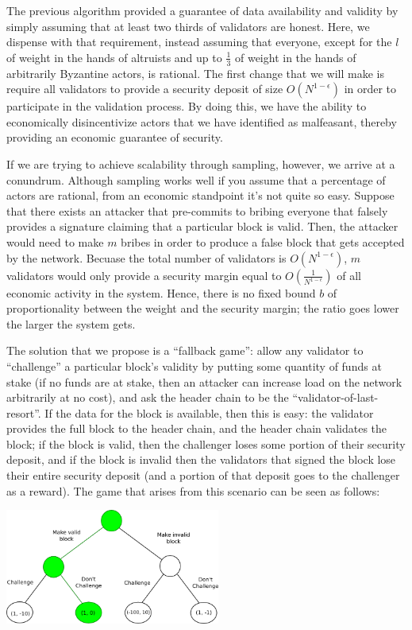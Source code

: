 \documentclass[11pt,a4paper]{report}
\theoremstyle{plain}
\theoremstyle{definition}
\theoremstyle{remark}
\begin{document}
The previous algorithm provided a guarantee of data availability and validity by simply assuming that at least two thirds of validators are honest. Here, we dispense with that requirement, instead assuming that everyone, except for the $l$ of weight in the hands of altruists and up to $\frac{1}{3}$ of weight in the hands of arbitrarily Byzantine actors, is rational. The first change that we will make is require all validators to provide a security deposit of size $O(N^{1-\epsilon})$ in order to participate in the validation process. By doing this, we have the ability to economically disincentivize actors that we have identified as malfeasant, thereby providing an economic guarantee of security.

If we are trying to achieve scalability through sampling, however, we arrive at a conundrum. Although sampling works well if you assume that a percentage of actors are rational, from an economic standpoint it's not quite so easy. Suppose that there exists an attacker that pre-commits to bribing everyone that falsely provides a signature claiming that a particular block is valid. Then, the attacker would need to make $m$ bribes in order to produce a false block that gets accepted by the network. Becuase the total number of validators is $O(N^{1-\epsilon})$, $m$ validators would only provide a security margin equal to $O(\frac{1}{N^{1-\epsilon}})$ of all economic activity in the system. Hence, there is no fixed bound $b$ of proportionality between the weight and the security margin; the ratio goes lower the larger the system gets.

The solution that we propose is a ``fallback game'': allow any validator to ``challenge'' a particular block's validity by putting some quantity of funds at stake (if no funds are at stake, then an attacker can increase load on the network arbitrarily at no cost), and ask the header chain to be the ``validator-of-last-resort''. If the data for the block is available, then this is easy: the validator provides the full block to the header chain, and the header chain validates the block; if the block is valid, then the challenger loses some portion of their security deposit, and if the block is invalid then the validators that signed the block lose their entire security deposit (and a portion of that deposit goes to the challenger as a reward). The game that arises from this scenario can be seen as follows:

\begin{center}
\includegraphics[width=200pt]{game.png}
\end{center}
\end{document}
